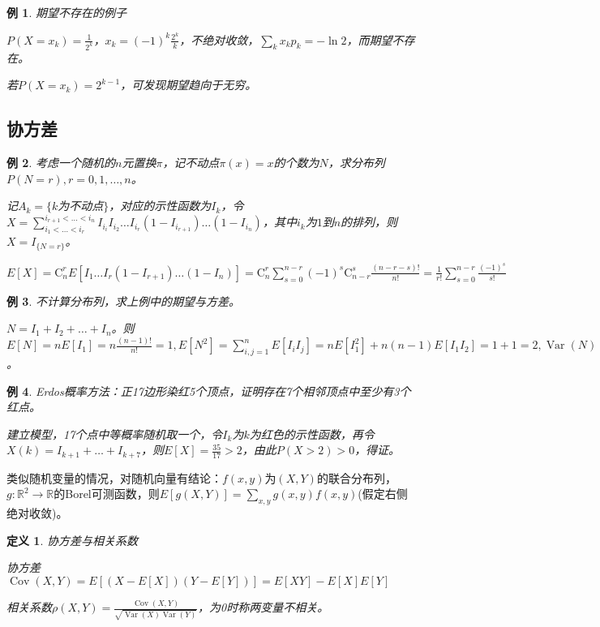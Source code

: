 \documentclass[a4paper,UTF8,fontset=windows]{ctexart}
\newtheorem{exmp}{例}[section]
\newtheorem{defi}{定义}[section]
\DeclareMathOperator{\Cov}{Cov}
\DeclareMathOperator{\Var}{Var}
\begin{document}
\begin{exmp} 期望不存在的例子

$P(X=x_k)=\frac{1}{2^k}$，$x_k=(-1)^k\frac{2^k}{k}$，不绝对收敛，$\sum_kx_kp_k=-\ln2$，而期望不存在。

若$P(X=x_k)=2^{k-1}$，可发现期望趋向于无穷。
\end{exmp}

\subsection{协方差}
\begin{exmp}
考虑一个随机的$n$元置换$\pi$，记不动点$\pi(x)=x$的个数为$N$，求分布列$P(N=r),r=0,1,\dots,n$。
	
记$A_k=\{k$为不动点$\}$，对应的示性函数为$I_k$，令$X=\sum_{i_1<\dots<i_r}^{i_{r+1}<\dots<i_n}I_{i_i}I_{i_2}\dots I_{i_r}(1-I_{i_{r+1}})\dots(1-I_{i_n})$，其中$i_k$为$1$到$n$的排列，则$X=I_{\{N=r\}}$。
	
	
$E[X]=\mathrm{C}_n^rE[I_1\dots I_r(1-I_{r+1})\dots(1-I_n)]=\mathrm{C}_n^r\sum_{s=0}^{n-r}(-1)^s\mathrm{C}_{n-r}^s\frac{(n-r-s)!}{n!}=\frac{1}{r!}\sum_{s=0}^{n-r}\frac{(-1)^s}{s!}$
\end{exmp}

\begin{exmp} 不计算分布列，求上例中的期望与方差。
	
$N=I_1+I_2+\dots+I_n$。则$E[N]=nE[I_1]=n\frac{(n-1)!}{n!}=1,E[N^2]=\sum_{i,j=1}^nE[I_iI_j]=nE[I_1^2]+n(n-1)E[I_1I_2]=1+1=2,\Var(N)=1$。
\end{exmp}

\begin{exmp} Erdos概率方法：正17边形染红5个顶点，证明存在7个相邻顶点中至少有3个红点。
	
建立模型，17个点中等概率随机取一个，令$I_k$为$k$为红色的示性函数，再令$X(k)=I_{k+1}+\dots+I_{k+7}$，则$E[X]=\frac{35}{17}>2$，由此$P(X>2)>0$，得证。
\end{exmp}

类似随机变量的情况，对随机向量有结论：$f(x,y)$为$(X,Y)$的联合分布列，$g:\mathbb{R}^2\to\mathbb{R}$的Borel可测函数，则$E[g(X,Y)]=\sum_{x,y}g(x,y)f(x,y)$(假定右侧绝对收敛)。

\begin{defi} 协方差与相关系数

协方差$\Cov(X,Y)=E[(X-E[X])(Y-E[Y])]=E[XY]-E[X]E[Y]$

相关系数$\rho(X,Y)=\frac{\Cov(X,Y)}{\sqrt{\Var(X)\Var(Y)}}$，为0时称两变量不相关。
\end{defi}
\end{document}
